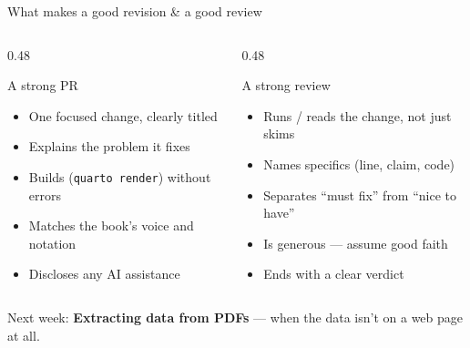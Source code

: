 \documentclass[9pt,aspectratio=169]{beamer}
\begin{document}
\begin{frame}{What makes a good revision \& a good review}
    \begin{columns}[T]
        \begin{column}{0.48\textwidth}
            \begin{block}{A strong PR}
                \begin{itemize}\small
                    \item One focused change, clearly titled
                    \item Explains the problem it fixes
                    \item Builds (\texttt{quarto render}) without errors
                    \item Matches the book's voice and notation
                    \item Discloses any AI assistance
                \end{itemize}
            \end{block}
        \end{column}
        \begin{column}{0.48\textwidth}
            \begin{block}{A strong review}
                \begin{itemize}\small
                    \item Runs / reads the change, not just skims
                    \item Names specifics (line, claim, code)
                    \item Separates ``must fix'' from ``nice to have''
                    \item Is generous --- assume good faith
                    \item Ends with a clear verdict
                \end{itemize}
            \end{block}
        \end{column}
    \end{columns}
    \vspace{0.5em}
    \centering\small Next week: \textbf{Extracting data from PDFs} --- when the data isn't on a web page at all.
\end{frame}
\end{document}
